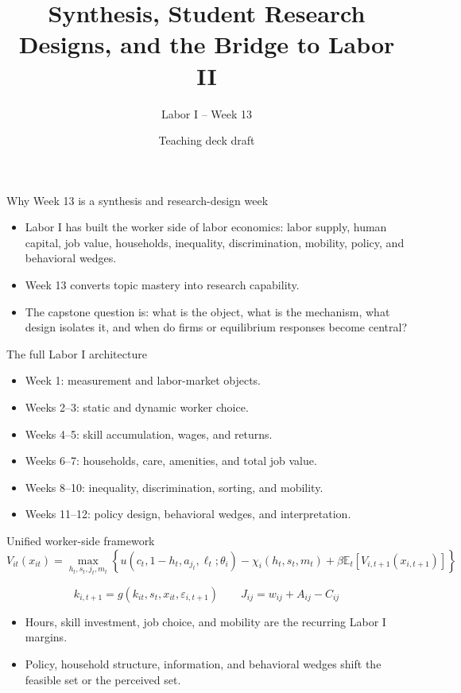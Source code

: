 \documentclass[aspectratio=169,11pt]{beamer}
\title{Synthesis, Student Research Designs, and the Bridge to Labor II}
\subtitle{Labor I -- Week 13}
\author{Teaching deck draft}
\date{}
\begin{document}
\begin{frame}
  \titlepage
\end{frame}

\begin{frame}{Why Week 13 is a synthesis and research-design week}
\begin{itemize}
    \item Labor I has built the worker side of labor economics: labor supply, human capital, job value, households, inequality, discrimination, mobility, policy, and behavioral wedges.
    \item Week 13 converts topic mastery into research capability.
    \item The capstone question is: what is the object, what is the mechanism, what design isolates it, and when do firms or equilibrium responses become central?
\end{itemize}
\end{frame}

\begin{frame}{The full Labor I architecture}
\begin{itemize}
    \item Week 1: measurement and labor-market objects.
    \item Weeks 2--3: static and dynamic worker choice.
    \item Weeks 4--5: skill accumulation, wages, and returns.
    \item Weeks 6--7: households, care, amenities, and total job value.
    \item Weeks 8--10: inequality, discrimination, sorting, and mobility.
    \item Weeks 11--12: policy design, behavioral wedges, and interpretation.
\end{itemize}
\end{frame}

\begin{frame}{Unified worker-side framework}
\[
V_{it}(x_{it})
=
\max_{h_t,s_t,j_t,m_t}
\left\{
u(c_t,1-h_t,a_{j_t},\ell_t;\theta_i)
- \chi_i(h_t,s_t,m_t)
+ \beta \mathbb{E}_t[V_{i,t+1}(x_{i,t+1})]
\right\}
\]

\[
k_{i,t+1} = g(k_{it}, s_t, x_{it}, \varepsilon_{i,t+1})
\qquad
J_{ij} = w_{ij} + A_{ij} - C_{ij}
\]

\begin{itemize}
    \item Hours, skill investment, job choice, and mobility are the recurring Labor I margins.
    \item Policy, household structure, information, and behavioral wedges shift the feasible set or the perceived set.
\end{itemize}
\end{frame}
\end{document}
